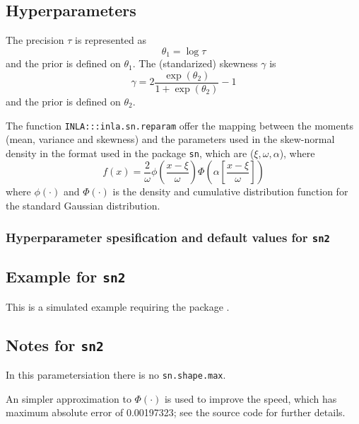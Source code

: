 \documentclass[a4paper,11pt]{article}
\begin{document}
\subsection*{Hyperparameters}
The precision $\tau$ is represented as
\begin{displaymath}
    \theta_{1} = \log \tau
\end{displaymath}
and the prior is defined on $\theta_{1}$. 
The (standarized) skewness $\gamma$ is 
\begin{displaymath}
    \gamma = 2 \frac{\exp(\theta_{2})}{1+\exp(\theta_{2})}-1
\end{displaymath}
and the prior is defined on $\theta_{2}$. 

The function \texttt{INLA:::inla.sn.reparam} offer the mapping between
the moments (mean, variance and skewness) and the parameters used in
the skew-normal density in the format used in the package \texttt{sn},
which are ($\xi, \omega, \alpha$), where
\begin{displaymath}
    f(x) = \frac{2}{\omega} \phi\left(\frac{x-\xi}{\omega}\right)
    \Phi\left(\alpha \left[\frac{x-\xi}{\omega}\right]\right)
\end{displaymath}
where $\phi(\cdot)$ and $\Phi(\cdot)$ is the density and cumulative
distribution function for the standard Gaussian distribution. 

\subsubsection*{Hyperparameter spesification and default values for
    \texttt{sn2}}


\subsection*{Example for \texttt{sn2}}

This is a simulated example requiring the package \verb@sn@.


\subsection*{Notes for \texttt{sn2}}

In this parametersiation there is no \texttt{sn.shape.max}.

An simpler approximation to $\Phi(\cdot)$ is used to improve the
speed, which has maximum absolute error of 0.00197323; see the source
code for further details.
\end{document}
